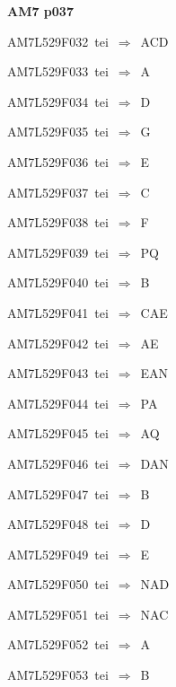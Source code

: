 \par\vfill\eject
{\bf\hfill AM7 p037\hfill\hbox{}}\par\bigskip
{\sixrm AM7L529F032\ {\sixit tei}\ }$\Rightarrow$\ ACD\par\smallskip
{\sixrm AM7L529F033\ {\sixit tei}\ }$\Rightarrow$\ A\par\smallskip
{\sixrm AM7L529F034\ {\sixit tei}\ }$\Rightarrow$\ D\par\smallskip
{\sixrm AM7L529F035\ {\sixit tei}\ }$\Rightarrow$\ G\par\smallskip
{\sixrm AM7L529F036\ {\sixit tei}\ }$\Rightarrow$\ E\par\smallskip
{\sixrm AM7L529F037\ {\sixit tei}\ }$\Rightarrow$\ C\par\smallskip
{\sixrm AM7L529F038\ {\sixit tei}\ }$\Rightarrow$\ F\par\smallskip
{\sixrm AM7L529F039\ {\sixit tei}\ }$\Rightarrow$\ PQ\par\smallskip
{\sixrm AM7L529F040\ {\sixit tei}\ }$\Rightarrow$\ B\par\smallskip
{\sixrm AM7L529F041\ {\sixit tei}\ }$\Rightarrow$\ CAE\par\smallskip
{\sixrm AM7L529F042\ {\sixit tei}\ }$\Rightarrow$\ AE\par\smallskip
{\sixrm AM7L529F043\ {\sixit tei}\ }$\Rightarrow$\ EAN\par\smallskip
{\sixrm AM7L529F044\ {\sixit tei}\ }$\Rightarrow$\ PA\par\smallskip
{\sixrm AM7L529F045\ {\sixit tei}\ }$\Rightarrow$\ AQ\par\smallskip
{\sixrm AM7L529F046\ {\sixit tei}\ }$\Rightarrow$\ DAN\par\smallskip
{\sixrm AM7L529F047\ {\sixit tei}\ }$\Rightarrow$\ B\par\smallskip
{\sixrm AM7L529F048\ {\sixit tei}\ }$\Rightarrow$\ D\par\smallskip
{\sixrm AM7L529F049\ {\sixit tei}\ }$\Rightarrow$\ E\par\smallskip
{\sixrm AM7L529F050\ {\sixit tei}\ }$\Rightarrow$\ NAD\par\smallskip
{\sixrm AM7L529F051\ {\sixit tei}\ }$\Rightarrow$\ NAC\par\smallskip
{\sixrm AM7L529F052\ {\sixit tei}\ }$\Rightarrow$\ A\par\smallskip
{\sixrm AM7L529F053\ {\sixit tei}\ }$\Rightarrow$\ B\par\smallskip

